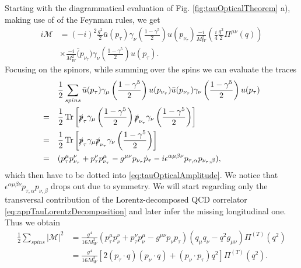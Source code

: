 Starting with the diagrammatical evaluation of Fig. \ref{fig:tauOpticalTheorem} a), making use of of the Feynman rules, we get
\begin{equation}
	\label{eq:tauOpticalAmplitude}
	\begin{split}
		i \mathcal{M} &= (-i)^2 \frac{g^2}{2} \bar u(p_\tau) \gamma_\nu \left(\frac{1-\gamma^5}{2}\right) u(p_{\nu_\tau}) \frac{-i}{M_W^2} \left(\frac{i}{4}\frac{g^2}{2} \Pi^{\mu\nu}(q)\right) \\
		&\times \frac{-i}{M_W^2} \bar(p_{\nu_\tau}) \gamma_\nu \left( \frac{1-\gamma^5}{2} \right) u(p_\tau).
	\end{split}
\end{equation}
Focusing on the spinors, while summing over the spins we can evaluate the traces
\begin{align}
		&\frac{1}{2} \sum_{spins} \bar u (p_\tau) \gamma_\mu \left(\frac{1-\gamma^5}{2}\right) u(p_{\nu_\tau}) \bar u(p_{\nu_\tau}) \gamma_\nu \left(\frac{1-\gamma^5}{2}\right) u(p_\tau) \\
		=\quad& \frac{1}{2} \Tr \left[ \slashed p_\tau \gamma_\mu \left(\frac{1-\gamma^5}{2} \right) \slashed p_{\nu_\tau} \gamma_\nu \left(\frac{1-\gamma^5}{2} \right) \right]\\
		=\quad&\frac{1}{2} \Tr \left[ \slashed p_\tau \gamma_\mu \slashed p_{\nu_\tau} \gamma_\nu \left( \frac{1 - \gamma^5}{2} \right) \right] \\
		=\quad & (p^\mu_\tau p_{\nu_\tau}^\nu + p_\tau^\nu p_{\nu_\tau}^\mu - g^{\mu\nu} p_{\nu_\tau} \dot p_\tau - i \epsilon^{\alpha\mu\beta\nu}p_{\tau, \alpha} p_{{\nu_\tau}, \beta} ),
\end{align}
which then have to be dotted into \eqref{eq:tauOpticalAmplitude}. We notice that $\epsilon^{\alpha\mu\beta\nu} p_{\tau, \alpha} p_{\nu, \beta}$ drops out due to symmetry. We will start regarding only the transversal contribution of the Lorentz-decomposed QCD correlator \eqref{eq:appTauLorentzDecomposition} and later infer the missing longitudinal one. Thus we obtain
\begin{equation}
	\label{eq:appTauAmplitude1}
	\begin{split}
		\frac{1}{2} \sum_{spins} | \mathcal{M}|^2 &= \frac{g^4}{16 M_W^2}(p_\tau^\mu p_\nu^\nu + p_\tau^\nu p_\nu^\mu - g^{\mu\nu} p_\nu p_\tau) (q_\mu q_\nu - q^2 g_{\mu\nu} ) \Pi^{(T)}(q^2) \\
		&=  \frac{g^4}{16 M_W^2} \left[2(p_\tau \cdot q) (p_\nu \cdot q) + (p_\nu \cdot p_\tau) q^2\right] \Pi^{(T)}(q^2).
	\end{split}
\end{equation}
